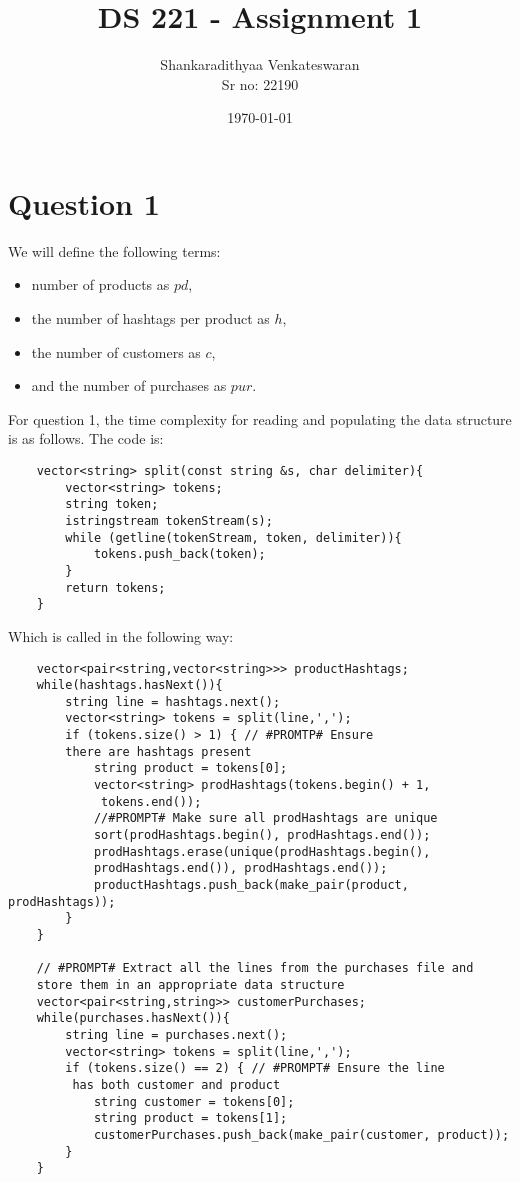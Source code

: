 \documentclass[12pt]{article}
\title{DS 221 - Assignment 1}
\author{Shankaradithyaa Venkateswaran\\ Sr no: 22190}
\date{\today}
\begin{document}
\begin{titlepage}
    \maketitle
\end{titlepage}

\section*{Question 1}
We will define the following terms:
\begin{itemize}
    \item number of products as $pd$,
    \item the number of hashtags per product as $h$, 
    \item the number of customers as $c$, 
    \item and the number of purchases as $pur$.
\end{itemize}
For question 1, the time complexity for reading and populating the data structure is as follows. The code is:
\begin{verbatim}
    vector<string> split(const string &s, char delimiter){
        vector<string> tokens;
        string token;
        istringstream tokenStream(s);
        while (getline(tokenStream, token, delimiter)){
            tokens.push_back(token);
        }
        return tokens;
    }
\end{verbatim}
Which is called in the following way:
\begin{verbatim}
    vector<pair<string,vector<string>>> productHashtags;
    while(hashtags.hasNext()){
        string line = hashtags.next();
        vector<string> tokens = split(line,',');
        if (tokens.size() > 1) { // #PROMTP# Ensure
        there are hashtags present
            string product = tokens[0];
            vector<string> prodHashtags(tokens.begin() + 1,
             tokens.end());
            //#PROMPT# Make sure all prodHashtags are unique
            sort(prodHashtags.begin(), prodHashtags.end());
            prodHashtags.erase(unique(prodHashtags.begin(), 
            prodHashtags.end()), prodHashtags.end());
            productHashtags.push_back(make_pair(product, prodHashtags));
        }
    }

    // #PROMPT# Extract all the lines from the purchases file and 
    store them in an appropriate data structure
    vector<pair<string,string>> customerPurchases;
    while(purchases.hasNext()){
        string line = purchases.next();
        vector<string> tokens = split(line,',');
        if (tokens.size() == 2) { // #PROMPT# Ensure the line
         has both customer and product
            string customer = tokens[0];
            string product = tokens[1];
            customerPurchases.push_back(make_pair(customer, product));
        }
    }
\end{verbatim}
\end{document}
